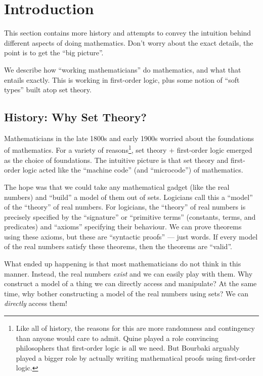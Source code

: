 \section{Introduction}

This section contains more history and attempts to convey the intuition
behind different aspects of doing mathematics. Don't worry about the
exact details, the point is to get the ``big picture''.

We describe how ``working mathematicians'' do mathematics, and what that
entails exactly. This is working in first-order logic, plus some notion
of ``soft types'' built atop set theory.

\subsection{History: Why Set Theory?}
Mathematicians in the late 1800s and early 1900s worried about the
foundations of mathematics. For a variety of reasons\footnote{Like all
of history, the reasons for this are more randomness and contingency
than anyone would care to admit. Quine played a role convincing
philosophers that first-order logic is all we need. But Bourbaki
arguably played a bigger role by actually writing mathematical proofs
using first-order logic.}, set theory +
first-order logic emerged as the choice of foundations. The intuitive
picture is that set theory and first-order logic acted like the
``machine code'' (and ``microcode'') of mathematics.

The hope was that we could take any mathematical gadget (like the real
numbers) and ``build'' a model of them out of sets. Logicians call this
a ``model'' of the ``theory'' of real numbers. For logicians, the
``theory'' of real numbers is precisely specified by the ``signature''
or ``primitive terms'' (constants, terms, and predicates) and ``axioms''
specifying their behaviour. We can prove theorems using these axioms,
but these are ``syntactic proofs'' --- just words. If every model of the
real numbers satisfy these theorems, then the theorems are ``valid''.

What ended up happening is that most mathematicians do not think in this
manner. Instead, the real numbers \emph{exist} and we can easily play
with them. Why construct a model of a thing we can directly access and
manipulate? At the same time, why bother constructing a model of the
real numbers using sets? We can \emph{directly} access them!

